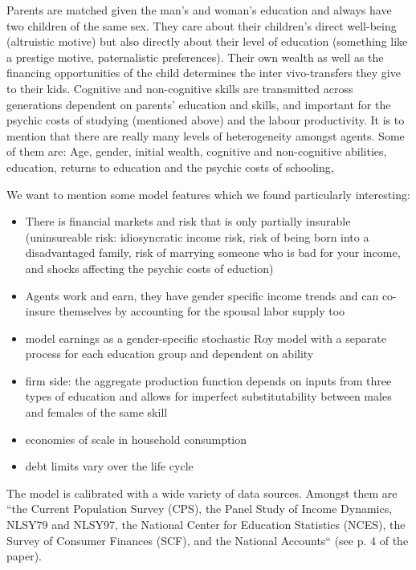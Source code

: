 \documentclass[12pt,a4paper]{article}
\begin{document}
Parents are matched given the man’s and woman’s education and always have two children of the same sex. They care about their children’s direct well-being (altruistic motive) but also directly about their level of education (something like a prestige motive, paternalistic preferences). Their own wealth as well as the financing opportunities of the child determines the inter vivo-transfers they give to their kids. Cognitive and non-cognitive skills are transmitted across generations dependent on parents’ education and skills, and important for the psychic costs of studying (mentioned above) and the labour productivity. 
It is to mention that there are really many levels of heterogeneity amongst agents. Some of them are: Age, gender, initial wealth, cognitive and non-cognitive abilities, education, returns to education and the psychic costs of schooling,

We want to mention some model features which we found particularly interesting:
\begin{itemize}
    \item There is financial markets and risk that is only partially insurable (uninsureable risk: idiosyncratic income risk, risk of being born into a disadvantaged family, risk of marrying someone who is bad for your income, and shocks affecting the psychic costs of eduction)
    \item Agents work and earn, they have gender specific income trends and can co-insure themselves by accounting for the spousal labor supply too
    \item model earnings as a gender-specific stochastic Roy model with a separate process for each education group and dependent on ability
    \item firm side: the aggregate production function depends on inputs from three types of education and allows for imperfect substitutability between males and females of the same skill
    \item economies of scale in household consumption
    \item debt limits vary over the life cycle
\end{itemize}

The model is calibrated with a wide variety of data sources. Amongst them are “the Current Population Survey (CPS), the Panel Study of Income Dynamics, NLSY79 and NLSY97, the National Center for Education Statistics (NCES), the Survey of Consumer Finances (SCF), and the National Accounts“ (see p. 4 of the paper). 
\end{document}
